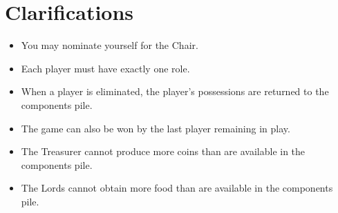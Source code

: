 \documentclass[12pt,a4paper,twocolumn]{article}
\newcommand{\lessspace}
{
\setlength{\itemsep}{0pt}
\setlength{\parskip}{0pt}
\setlength{\parsep}{0pt}
}
\newenvironment{lessitemize}
{
\begin{itemize}
\lessspace
}
{
\end{itemize}
}
\begin{document}
\section{Clarifications}

\begin{lessitemize}
\item You may nominate yourself for the Chair.
\item Each player must have exactly one role.
\item When a player is eliminated, the player's possessions are returned to the components pile.
\item The game can also be won by the last player remaining in play.
\item The Treasurer cannot produce more coins than are available in the components pile.
\item The Lords cannot obtain more food than are available in the components pile.
\end{lessitemize}
\end{document}
